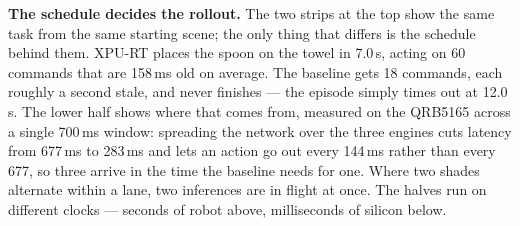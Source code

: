 
\caption{\textbf{The schedule decides the rollout.}
The two strips at the top show the same task from the same starting scene; the
only thing that differs is the schedule behind them. XPU-RT places the spoon on
the towel in 7.0\,s, acting on 60 commands that are 158\,ms old on average. The
baseline gets 18 commands, each roughly a second stale, and never finishes ---
the episode simply times out at 12.0\,s. The lower half shows where that comes
from, measured on the QRB5165 across a single 700\,ms window: spreading the
network over the three engines cuts latency from 677\,ms to 283\,ms and lets an
action go out every 144\,ms rather than every 677, so three arrive in the time
the baseline needs for one. Where two shades alternate within a lane, two
inferences are in flight at once. The halves run on different clocks --- seconds
of robot above, milliseconds of silicon below.}

